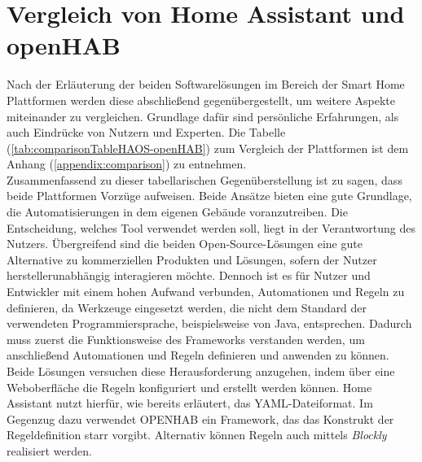 \section{Vergleich von Home Assistant und openHAB}
\label{sec:comparison-HAOS-openHAB}
    Nach der Erläuterung der beiden Softwarelösungen im Bereich der Smart Home Plattformen werden diese abschließend 
    gegenübergestellt, um weitere Aspekte miteinander zu vergleichen. Grundlage dafür sind persönliche Erfahrungen, als auch 
    Eindrücke von Nutzern und Experten. Die Tabelle (\ref{tab:comparisonTableHAOS-openHAB}) zum Vergleich 
    der Plattformen ist dem Anhang (\ref{appendix:comparison}) zu entnehmen.
    \\
    \linebreak
    Zusammenfassend zu dieser tabellarischen Gegenüberstellung ist zu sagen, dass beide Plattformen Vorzüge aufweisen.  
    Beide Ansätze bieten eine gute Grundlage, die Automatisierungen in dem eigenen Gebäude voranzutreiben. Die Entscheidung, welches 
    Tool verwendet werden soll, liegt in der Verantwortung des Nutzers. Übergreifend sind die beiden Open-Source-Lösungen eine gute 
    Alternative zu kommerziellen Produkten und Lösungen, sofern der Nutzer herstellerunabhängig interagieren möchte. Dennoch ist 
    es für Nutzer und Entwickler mit einem hohen Aufwand verbunden, Automationen und Regeln zu definieren, da Werkzeuge eingesetzt werden, 
    die nicht dem Standard der verwendeten Programmiersprache, beispielsweise von Java, 
    entsprechen. Dadurch muss zuerst die Funktionsweise des Frameworks verstanden werden, um anschließend Automationen und 
    Regeln definieren und anwenden zu können. Beide Lösungen versuchen diese Herausforderung anzugehen, indem über eine Weboberfläche 
    die Regeln konfiguriert und erstellt werden können. Home Assistant nutzt hierfür, wie bereits erläutert, das YAML-Dateiformat. Im 
    Gegenzug dazu verwendet \acs{OPENHAB} ein Framework, das das Konstrukt der Regeldefinition starr vorgibt. Alternativ können Regeln auch 
    mittels \textit{Blockly} realisiert werden. 
